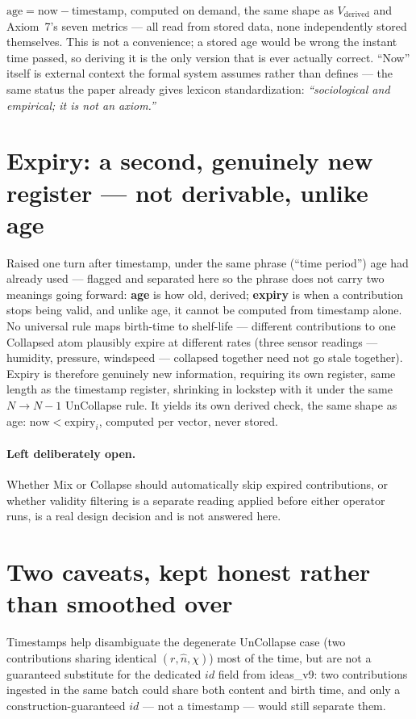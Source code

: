 \documentclass[11pt]{article}
\begin{document}
$\text{age}=\text{now}-\text{timestamp}$, computed on demand, the
same shape as $V_{\text{derived}}$ and Axiom~7's seven metrics ---
all read from stored data, none independently stored themselves.
This is not a convenience; a stored age would be wrong the instant
time passed, so deriving it is the only version that is ever
actually correct. ``Now'' itself is external context the formal
system assumes rather than defines --- the same status the paper
already gives lexicon standardization: \emph{``sociological and
empirical; it is not an axiom.''}

\section{Expiry: a second, genuinely new register --- not derivable,
unlike age}

Raised one turn after timestamp, under the same phrase (``time
period'') age had already used --- flagged and separated here so the
phrase does not carry two meanings going forward: \textbf{age} is
how old, derived; \textbf{expiry} is when a contribution stops being
valid, and unlike age, it cannot be computed from timestamp alone.
No universal rule maps birth-time to shelf-life --- different
contributions to one Collapsed atom plausibly expire at different
rates (three sensor readings --- humidity, pressure, windspeed ---
collapsed together need not go stale together). Expiry is therefore
genuinely new information, requiring its own register, same length
as the timestamp register, shrinking in lockstep with it under the
same $N\to N-1$ UnCollapse rule. It yields its own derived check, the
same shape as age: $\text{now}<\text{expiry}_i$, computed per vector,
never stored.

\paragraph{Left deliberately open.} Whether Mix or Collapse should
automatically skip expired contributions, or whether validity
filtering is a separate reading applied before either operator runs,
is a real design decision and is not answered here.

\section{Two caveats, kept honest rather than smoothed over}

Timestamps help disambiguate the degenerate UnCollapse case (two
contributions sharing identical $(r,\hat n,\chi)$) most of the time,
but are not a guaranteed substitute for the dedicated $id$ field
from ideas\_v9: two contributions ingested in the same batch could
share both content and birth time, and only a construction-guaranteed
$id$ --- not a timestamp --- would still separate them.
\end{document}
